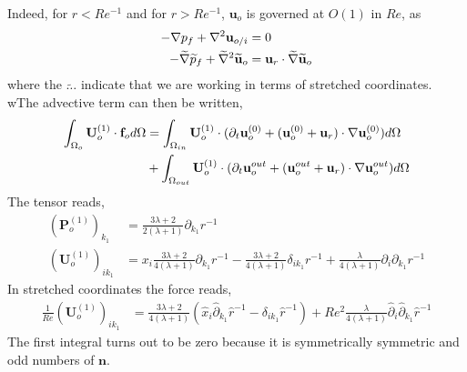 Indeed, for $r < Re^{-1}$ and for $r > Re^{-1}$, $\textbf{u}_o$ is governed at $O(1)$ in $Re$,  as
\begin{align*}
    - \grad p_f
    + \grad^2 \textbf{u}_{o/i}
    &= 0 \\
    - \widetilde{\grad} \widetilde{p}_f
    + \widetilde{\grad}^2 \widetilde{\textbf{u}}_{o}
    &= \textbf{u}_r\cdot \widetilde{\grad} \widetilde{\textbf{u}}_{o}
\end{align*}
where the $\widetilde{\ldots}$ indicate that we are working in terms of stretched coordinates.
wThe advective term can then be written,
\begin{align}
    \intO[o]{\textbf{U}_{o}^{(1)}\cdot \textbf{f}_{o}}
    &=
    \intO[in]{\textbf{U}_{o}^{(1)}\cdot (\pddt \textbf{u}_{o}^{(0)}
    + (\textbf{u}_{o}^{(0)}+\textbf{u}_r)\cdot \grad \textbf{u}_{o}^{(0)})}\\
    &+\intO[out]{\textbf{U}_{o}^{(1)}\cdot (\pddt \textbf{u}_{o}^{out}
    + (\textbf{u}_{o}^{out}+\textbf{u}_r)\cdot \grad \textbf{u}_{o}^{out})}
\end{align}
The tensor reads,
\begin{align*}
    (\textbf{P}_o^{(1)})_{k_1}
    &=
    \frac{3\lambda +2}{2(\lambda+1)}\partial_{k_1}r^{-1}\\
    (\textbf{U}_o^{(1)})_{i k_1}
    &=
    x_i \frac{3\lambda +2}{4(\lambda+1)}\partial_{k_1}r^{-1}
    - \frac{3\lambda +2}{4(\lambda+1)}\delta_{ik_1}r^{-1}
    +\frac{\lambda}{4(\lambda+1)} \partial_i \partial_{k_1} r^{-1}
\end{align*}
In stretched coordinates the force reads,
\begin{align*}
    \frac{1}{Re}(\textbf{U}_o^{(1)})_{i k_1}
    &=
     \frac{3\lambda +2}{4(\lambda+1)} (\hat{x}_i\hat{\partial}_{k_1}\hat{r}^{-1}
    - \delta_{ik_1}\hat{r}^{-1})
    + Re^2\frac{\lambda}{4(\lambda+1)} \hat{\partial}_i \hat{\partial}_{k_1} \hat{r}^{-1}
\end{align*}
The first integral turns out to be zero because it is symmetrically symmetric and odd numbers of $\textbf{n}$.
